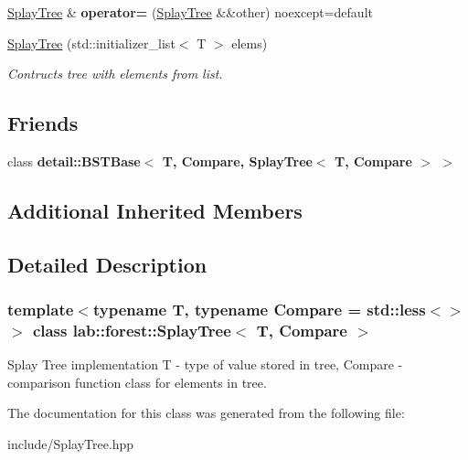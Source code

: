 \begin{DoxyCompactItemize}
\item 
\mbox{\label{classlab_1_1forest_1_1SplayTree_a0b911d6bb9706deb08073dd32564409f}} 
\hyperlink{classlab_1_1forest_1_1SplayTree}{Splay\+Tree} \& {\bfseries operator=} (\hyperlink{classlab_1_1forest_1_1SplayTree}{Splay\+Tree} \&\&other) noexcept=default
\item 
\mbox{\label{classlab_1_1forest_1_1SplayTree_a31ad5b81f62cd1aae5ef95124859817a}} 
\hyperlink{classlab_1_1forest_1_1SplayTree_a31ad5b81f62cd1aae5ef95124859817a}{Splay\+Tree} (std\+::initializer\+\_\+list$<$ T $>$ elems)
\begin{DoxyCompactList}\small\item\em Contructs tree with elements from list. \end{DoxyCompactList}\end{DoxyCompactItemize}
\subsection*{Friends}
\begin{DoxyCompactItemize}
\item 
\mbox{\label{classlab_1_1forest_1_1SplayTree_a48b849668934ff66df6b9e92ced3e9d6}} 
class {\bfseries detail\+::\+B\+S\+T\+Base$<$ T, Compare, Splay\+Tree$<$ T, Compare $>$ $>$}
\end{DoxyCompactItemize}
\subsection*{Additional Inherited Members}


\subsection{Detailed Description}
\subsubsection*{template$<$typename T, typename Compare = std\+::less$<$$>$$>$\newline
class lab\+::forest\+::\+Splay\+Tree$<$ T, Compare $>$}

Splay Tree implementation T -\/ type of value stored in tree, Compare -\/ comparison function class for elements in tree. 

The documentation for this class was generated from the following file\+:\begin{DoxyCompactItemize}
\item 
include/Splay\+Tree.\+hpp\end{DoxyCompactItemize}

